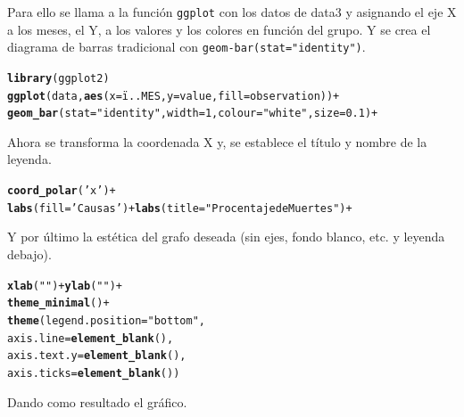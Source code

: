 \documentclass{article}\usepackage[]{graphicx}\usepackage[]{color}
\makeatletter
\newcommand{\hlstr}[1]{\textcolor[rgb]{0.192,0.494,0.8}{#1}}%
\newcommand{\hlopt}[1]{\textcolor[rgb]{0,0,0}{#1}}%
\newcommand{\hlstd}[1]{\textcolor[rgb]{0.345,0.345,0.345}{#1}}%
\newcommand{\hlkwc}[1]{\textcolor[rgb]{0.333,0.667,0.333}{#1}}%
\newcommand{\hlkwd}[1]{\textcolor[rgb]{0.737,0.353,0.396}{\textbf{#1}}}%
\newenvironment{kframe}{%
 \def\at@end@of@kframe{}%
 \ifinner\ifhmode%
  \def\at@end@of@kframe{\end{minipage}}%
  \begin{minipage}{\columnwidth}%
 \fi\fi%
 \def\FrameCommand##1{\hskip\@totalleftmargin \hskip-\fboxsep
 \colorbox{shadecolor}{##1}\hskip-\fboxsep
     \hskip-\linewidth \hskip-\@totalleftmargin \hskip\columnwidth}%
 \MakeFramed {\advance\hsize-\width
   \@totalleftmargin\z@ \linewidth\hsize
   \@setminipage}}%
 {\par\unskip\endMakeFramed%
 \at@end@of@kframe}
\newenvironment{knitrout}{}{} %
\makeatother
\begin{document}
Para ello se llama a la funci\'on \texttt{ggplot} con los datos de data3 y asignando el eje X a los meses, el Y, a los valores y los colores en funci\'on del grupo. Y se crea el diagrama de barras tradicional con \texttt{geom-bar(stat="identity")}.
\begin{knitrout}
\color{fgcolor}\begin{kframe}
\begin{alltt}
\hlkwd{library}(ggplot2)
\hlkwd{ggplot}(data,\hlkwd{aes}(x=ï..MES,y=value,fill=observation))+
  \hlkwd{geom_bar}(stat=\hlstr{"identity"},width=1,colour=\hlstr{"white"},size=0.1)+
\end{alltt}
\end{kframe}
\end{knitrout}
Ahora se transforma la coordenada X y, se establece el t\'itulo y nombre de la leyenda.
\begin{knitrout}
\color{fgcolor}\begin{kframe}
\begin{alltt}
  \hlkwd{coord_polar}(\hlstr{'x'})+
  \hlkwd{labs}(fill=\hlstr{'Causas'}) + \hlkwd{labs}(title = \hlstr{"Procentaje de Muertes"}) +
\end{alltt}
\end{kframe}
\end{knitrout}
Y por \'ultimo la est\'etica del grafo deseada (sin ejes, fondo blanco, etc. y leyenda debajo).
\begin{knitrout}
\color{fgcolor}\begin{kframe}
\begin{alltt}
  \hlkwd{xlab}\hlstd{(}\hlstr{""}\hlstd{)}\hlopt{+}\hlkwd{ylab}\hlstd{(}\hlstr{""}\hlstd{)} \hlopt{+}
  \hlkwd{theme_minimal}\hlstd{()} \hlopt{+}
  \hlkwd{theme}\hlstd{(}\hlkwc{legend.position} \hlstd{=} \hlstr{"bottom"}\hlstd{,}
        \hlkwc{axis.line} \hlstd{=} \hlkwd{element_blank}\hlstd{(),}
        \hlkwc{axis.text.y} \hlstd{=} \hlkwd{element_blank}\hlstd{(),}
        \hlkwc{axis.ticks} \hlstd{=} \hlkwd{element_blank}\hlstd{())}
\end{alltt}
\end{kframe}
\end{knitrout}
Dando como resultado el gr\'afico.
\end{document}
